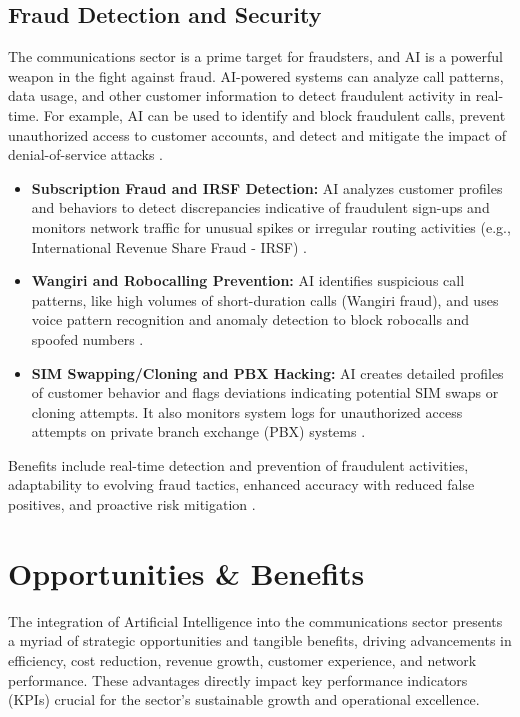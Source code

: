 \subsection{Fraud Detection and Security}
The communications sector is a prime target for fraudsters, and AI is a powerful weapon in the fight against fraud. AI-powered systems can analyze call patterns, data usage, and other customer information to detect fraudulent activity in real-time. For example, AI can be used to identify and block fraudulent calls, prevent unauthorized access to customer accounts, and detect and mitigate the impact of denial-of-service attacks \cite{wef2020impact}.
\begin{itemize}
    \item \textbf{Subscription Fraud and IRSF Detection:} AI analyzes customer profiles and behaviors to detect discrepancies indicative of fraudulent sign-ups and monitors network traffic for unusual spikes or irregular routing activities (e.g., International Revenue Share Fraud - IRSF) \cite{TheFastMode_Fraud, HGS_Fraud}.
    \item \textbf{Wangiri and Robocalling Prevention:} AI identifies suspicious call patterns, like high volumes of short-duration calls (Wangiri fraud), and uses voice pattern recognition and anomaly detection to block robocalls and spoofed numbers \cite{FlyAPS_Fraud, NeuralT_Fraud}.
    \item \textbf{SIM Swapping/Cloning and PBX Hacking:} AI creates detailed profiles of customer behavior and flags deviations indicating potential SIM swaps or cloning attempts. It also monitors system logs for unauthorized access attempts on private branch exchange (PBX) systems \cite{SPDTech_Fraud, NeuralT_Fraud_2}.
\end{itemize}
Benefits include real-time detection and prevention of fraudulent activities, adaptability to evolving fraud tactics, enhanced accuracy with reduced false positives, and proactive risk mitigation \cite{BridgeConnect_Fraud, Subex_Fraud}.

\section{Opportunities \& Benefits}

The integration of Artificial Intelligence into the communications sector presents a myriad of strategic opportunities and tangible benefits, driving advancements in efficiency, cost reduction, revenue growth, customer experience, and network performance. These advantages directly impact key performance indicators (KPIs) crucial for the sector's sustainable growth and operational excellence.

